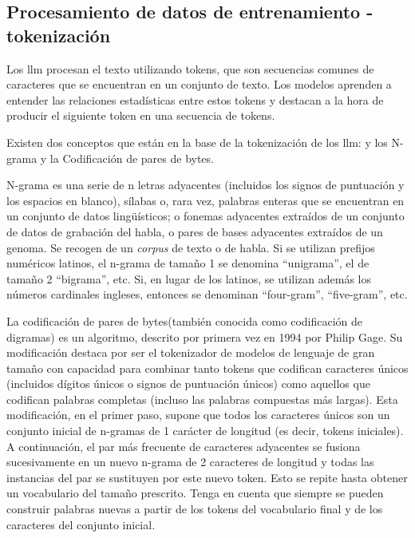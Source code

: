 
\subsection{Procesamiento de datos de entrenamiento - tokenización}

Los \acrlong{llm} procesan el texto utilizando tokens, que son secuencias comunes de caracteres que se encuentran en un conjunto de texto. Los modelos aprenden a entender las relaciones estadísticas entre estos tokens y destacan a la hora de producir el siguiente token en una secuencia de tokens\cite{OpenAI_Tokenizer}.


Existen dos conceptos que están en la base de la tokenización de los \acrshort{llm}: y los N-grama y la Codificación de pares de bytes.

N-grama es una serie de n letras adyacentes (incluidos los signos de puntuación y los espacios en blanco), sílabas o, rara vez, palabras enteras que se encuentran en un conjunto de datos lingüísticos; o fonemas adyacentes extraídos de un conjunto de datos de grabación del habla, o pares de bases adyacentes extraídos de un genoma. Se recogen de un \textit{corpus} de texto o de habla. Si se utilizan prefijos numéricos latinos, el n-grama de tamaño 1 se denomina ``unigrama'', el de tamaño 2 ``bigrama'', etc. Si, en lugar de los latinos, se utilizan además los números cardinales ingleses, entonces se denominan ``four-gram'', ``five-gram'', etc. 

La codificación de pares de bytes(también conocida como codificación de digramas) es un algoritmo, descrito por primera vez en 1994 por Philip Gage\cite{Gage_Compresion}. Su modificación destaca por ser el tokenizador de modelos de lenguaje de gran tamaño con capacidad para combinar tanto tokens que codifican caracteres únicos (incluidos dígitos únicos o signos de puntuación únicos) como aquellos que codifican palabras completas (incluso las palabras compuestas más largas). Esta modificación, en el primer paso, supone que todos los caracteres únicos son un conjunto inicial de n-gramas de 1 carácter de longitud (es decir, tokens iniciales). A continuación, el par más frecuente de caracteres adyacentes se fusiona sucesivamente en un nuevo n-grama de 2 caracteres de longitud y todas las instancias del par se sustituyen por este nuevo token. Esto se repite hasta obtener un vocabulario del tamaño prescrito. Tenga en cuenta que siempre se pueden construir palabras nuevas a partir de los tokens del vocabulario final y de los caracteres del conjunto inicial.

